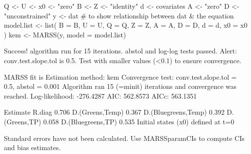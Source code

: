 \begin{Schunk}
\begin{Sinput}
 Q <- U <- x0 <- "zero"
 B <- Z <- "identity"
 d <- covariates
 A <- "zero"
 D <- "unconstrained"
 y <- dat # to show relationship between dat & the equation
 model.list <- list(
   B = B, U = U, Q = Q, Z = Z, A = A,
   D = D, d = d, x0 = x0
 )
 kem <- MARSS(y, model = model.list)
\end{Sinput}
\begin{Soutput}
Success! algorithm run for 15 iterations. abstol and log-log tests passed.
Alert: conv.test.slope.tol is 0.5.
Test with smaller values (<0.1) to ensure convergence.

MARSS fit is
Estimation method: kem 
Convergence test: conv.test.slope.tol = 0.5, abstol = 0.001
Algorithm ran 15 (=minit) iterations and convergence was reached. 
Log-likelihood: -276.4287 
AIC: 562.8573   AICc: 563.1351   
 
                    Estimate
R.diag                 0.706
D.(Greens,Temp)        0.367
D.(Bluegreens,Temp)    0.392
D.(Greens,TP)          0.058
D.(Bluegreens,TP)      0.535
Initial states (x0) defined at t=0

Standard errors have not been calculated. 
Use MARSSparamCIs to compute CIs and bias estimates.
\end{Soutput}
\end{Schunk}
